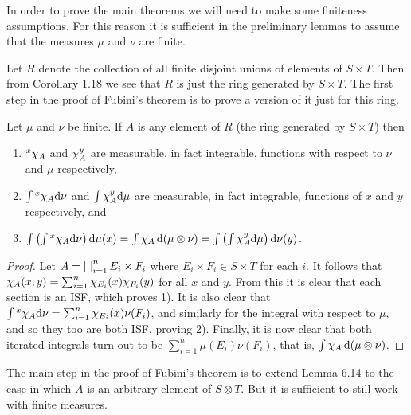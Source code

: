 In order to prove the main theorems we will need to make some finiteness assumptions. For this reason it is sufficient in the preliminary lemmas to assume that the measures $\mu$ and $\nu$ are finite.

Let $R$ denote the collection of all finite disjoint unions of elements of $S\times T$. Then from Corollary 1.18 we see that $R$ is just the ring generated by $S\times T$. The first step in the proof of Fubini's theorem is to prove a version of it just for this ring.

\begin{lemma}
Let $\mu$ and $\nu$ be finite. If $A$ is any element of $R$ (the ring generated by $S\times T$) then
\begin{enumerate}[label=\arabic*)]
    \item $\xsec{\idf{A}}{x}$ and $\ysec{\idf{A}}{y}$ are measurable, in fact integrable, functions with respect to $\nu$ and $\mu$ respectively,

    \item $\int\xsec{\idf{A}}{x}\dd\nu$ and $\int\ysec{\idf{A}}{y}\dd\mu$ are measurable, in fact integrable, functions of $x$ and $y$ respectively, and

    \item $\int\br{\int\xsec{\idf{A}}{x}\dd\nu}\dd\mu(x)=\int\idf{A}\dd(\mu\otimes\nu)=\int\br{\int\ysec{\idf{A}}{y}\dd\mu}\dd\nu(y)$.
\end{enumerate}
\end{lemma}

\begin{proof}
Let $A=\bigdu_{i=1}^nE_i\times F_i$ where $E_i\times F_i\in S\times T$ for each $i$. It follows that $\idf{A}(x,y)=\sum_{i=1}^n\idf{E_i}(x)\idf{F_i}(y)$ for all $x$ and $y$. From this it is clear that each section is an ISF, which proves 1). It is also clear that $\int\xsec{\idf{A}}{x}\dd\nu=\sum_{i=1}^n\idf{E_i}(x)\nu(F_i)$, and similarly for the integral with respect to $\mu$, and so they too are both ISF, proving 2). Finally, it is now clear that both iterated integrals turn out to be $\sum_{i=1}^n\mu(E_i)\nu(F_i)$, that is, $\int\idf{A}\dd(\mu\otimes\nu)$.
\end{proof}

The main step in the proof of Fubini's theorem is to extend Lemma 6.14 to the case in which $A$ is an arbitrary element of $S\otimes T$. But it is sufficient to still work with finite measures.

